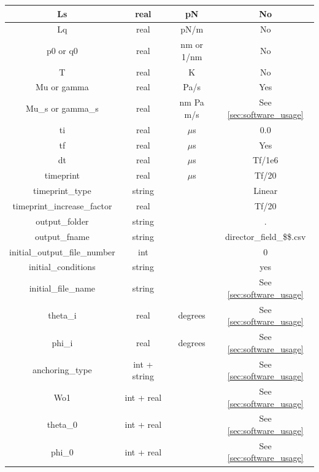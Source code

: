 \documentclass[final,5p,times,twocolumn]{elsarticle}
\begin{document}
\begin{center}
\begin{longtable}{|c|c|c|c|}
          \hline
          { Ls} & real & pN & No   \\ 
          \hline
          { Lq} & real & pN/m & No   \\ 
          \hline 
          {p0 or q0} & real & nm or 1/nm & No \\ 
          \hline
          {T}  & real & K	& No \\ 
          \hline 
          {Mu or gamma} & real & Pa/s & Yes \\ 
          \hline 
          {Mu\_s or gamma\_s} & real & nm Pa m/s&  See \ref{sec:software_usage}\\ 
          \hline 
          {ti}& real & $\mu$s  & 0.0 \\ 
          \hline 
          {tf}& real & $\mu$s  & Yes\\ 
          \hline 
          {dt}& real & $\mu$s  & Tf/1e6 \\ 
          \hline 
          {timeprint}& real & $\mu$s &  Tf/20 \\ 
          \hline 
          {timeprint\_type}& string &  & Linear\\ 
          \hline 
          {timeprint\_increase\_factor}& real&   & Tf/20 \\ 
          \hline 
          {output\_folder}&	string & & . \\ 
          \hline 
          {output\_fname}&	string & & director\_field\_\$\$.csv \\ 
          \hline 
          {initial\_output\_file\_number} & int & & 0 \\ 
          \hline 
          {initial\_conditions} & string & & yes \\ 
          \hline 
          {initial\_file\_name} & string & & See \ref{sec:software_usage} \\ 
          \hline 
          {theta\_i} &	real & degrees & See \ref{sec:software_usage} \\ 
          \hline 
          {phi\_i} &	real & degrees  & See \ref{sec:software_usage}\\ 
          \hline 
          {anchoring\_type} & int + string & & See \ref{sec:software_usage}\\ 
          \hline 
          {Wo1}& int + real & &  See \ref{sec:software_usage}  \\ 
          \hline 
          {theta\_0} &  int + real  & & See \ref{sec:software_usage} \\ 
          \hline 
          {phi\_0} &	 int + real  & & See \ref{sec:software_usage} \\ 
          \hline 
	\end{longtable} 
\end{center}
\twocolumn
 
\end{document}
